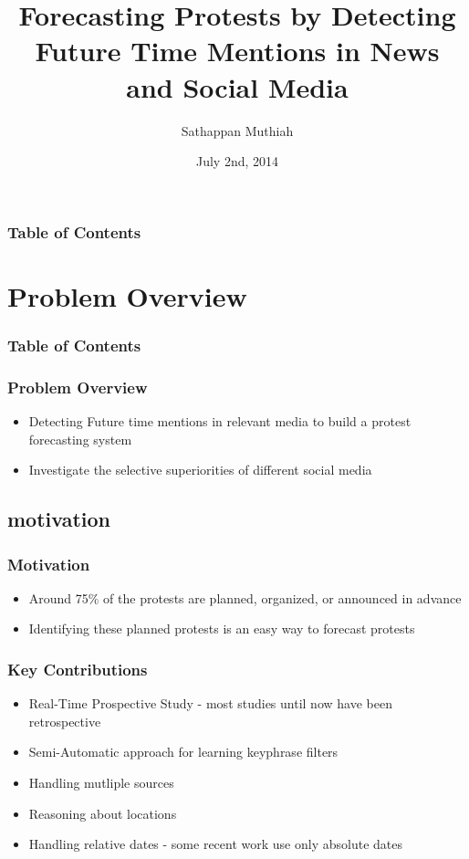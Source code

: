 \documentclass[red]{beamer}
\begin{document}
\title[Planned Protest]{Forecasting Protests by Detecting Future Time Mentions in News and Social Media
}
\author{Sathappan Muthiah}
\date{July 2nd, 2014}
\subject{Computer Science}


\frame{\titlepage}



\begin{frame}
\frametitle{Table of Contents}
\tableofcontents
\end{frame}

\section{Problem Overview}
\begin{frame}
\frametitle{Table of Contents}
\tableofcontents[currentsection]
\end{frame}


\begin{frame}
    \frametitle{Problem Overview}
    \begin{itemize}
        \item
            Detecting Future time mentions in relevant media to build a protest forecasting system
        \item
            Investigate the selective superiorities of different social media
    \end{itemize}
\end{frame}

\subsection{motivation}
\begin{frame}
    \frametitle{Motivation}
    \begin{itemize}
        \item
            Around 75\% of the protests are planned, organized, or announced in advance
        \item
            Identifying these planned protests is an easy way to forecast protests
    \end{itemize}
\end{frame}


\begin{frame}
    \frametitle{Key Contributions}
    \begin{itemize}
        \item
            Real-Time Prospective Study - most studies until now have been retrospective
        \item
            Semi-Automatic approach for learning keyphrase filters
        \item
            Handling mutliple sources
        \item
            Reasoning about locations
        \item
            Handling relative dates - some recent work use only absolute dates
    \end{itemize}
\end{frame}
\end{document}
